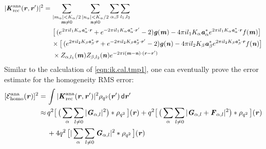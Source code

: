 \documentclass[journal=jacsat,manuscript=article]{achemso}
\renewcommand{\v}[1]{\textbf{\textit{#1}}}
\renewcommand{\d}[1]{\textsf{#1}}
\begin{document}
\begin{align}
  \vert\v K^{\textrm{ana}}_{\textrm{rec}}(\v r,\v r')\vert^2
  =\,&
  \sum_{
    \begin{subarray}{c}
      \vert m_{\alpha}\vert < K_\alpha/2\\
      \v m\neq 0
    \end{subarray}}
  \sum_{
    \begin{subarray}{c}
      \vert n_{\alpha}\vert < K_\alpha/2\\
      \v n\neq 0
    \end{subarray}}
  \sum_{\alpha,\beta}
  \sum_{l_1,l_2}
  \\\nonumber
  &\,
  \big[
  \,(
  e^{2\pi i l_1 K_\alpha\v a^\ast_\alpha\cdot \v r} +
  e^{-2\pi i l_1 K_\alpha\v a^\ast_\alpha\cdot \v r'}
  - 2
  )
  \v g(\v m)
  - 4\pi i l_1 K_\alpha\v a_\alpha^\ast e^{2\pi i l_1 K_\alpha\v a^\ast_\alpha\cdot \v r}
  f(\v m)
  \big] \\\nonumber
  \,&
  \times
  \big[
  \,(
  e^{2\pi i l_2 K_\beta\v a^\ast_\beta\cdot \v r} +
  e^{-2\pi i l_2 K_\beta\v a^\ast_\beta\cdot \v r'}
  - 2
  )
  \v g(\v n)
  - 4\pi i l_2 K_\beta\v a_\beta^\ast e^{2\pi i l_2 K_\beta\v a^\ast_\beta\cdot \v r}
  f(\v n)
  \big]
  \\
  &\,
  \times
  Z_{\alpha,l_1}(\v m)Z_{\beta,l_2}(\v n)
  e^{-2\pi i(\v m-\v n)\cdot(\v r-\v r')}
\end{align}
Similar to the calculation of \ref{eqn:ik.cal.tmp1}, one can eventually
prove the error estimate for the homogeneity RMS error:
\begin{align}\nonumber
  [\mathcal E^{\textrm{ana}}_{\textrm{homo}}(\v r)]^2
  = \,&
  \int
  \vert\v K^{\textrm{ana}}_{\textrm{rec}}(\v r,\v r')\vert^2
  \rho_{q^2}(\v r')\,\d d\v r' \\\nonumber
  \approx\,&  
  q^2
  \big[\,
  \big(
  \sum_{\alpha} \sum_{l\neq 0}
  \vert \v G_{\alpha,l}\vert^2
  \big)
  \ast \rho_{q^2}
  \,\big] (\v r) +
  q^2
  \big[\,
  \big(
  \sum_{\alpha} \sum_{l\neq 0}
  \vert \v G_{\alpha,l} +\v F_{\alpha,l}\vert^2
  \big)
  \ast \rho_{q^2}
  \,\big] (\v r) \\
  \,&+
  4q^2\,
  \big[
  \vert
  \sum_{\alpha} \sum_{l\neq 0}  
  \v G_{\alpha,l}
  \vert^2
  \ast \rho_{q^2}\,
  \big] (\v r) 
\end{align}
\end{document}
